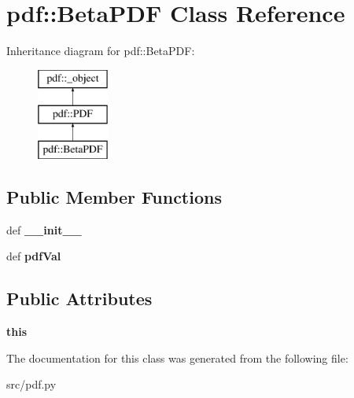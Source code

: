 \hypertarget{classpdf_1_1BetaPDF}{
\section{pdf::BetaPDF Class Reference}
\label{d4/dae/classpdf_1_1BetaPDF}
}
Inheritance diagram for pdf::BetaPDF:\begin{figure}[H]
\begin{center}
\leavevmode
\includegraphics[height=3cm]{d4/dae/classpdf_1_1BetaPDF}
\end{center}
\end{figure}
\subsection*{Public Member Functions}
\begin{DoxyCompactItemize}
\item 
\hypertarget{classpdf_1_1BetaPDF_a20df6a985b59544305063ed17b7358c5}{
def {\bfseries \_\-\_\-init\_\-\_\-}}
\label{d4/dae/classpdf_1_1BetaPDF_a20df6a985b59544305063ed17b7358c5}

\item 
\hypertarget{classpdf_1_1BetaPDF_ad7f9b56263693e180c38d788048299f0}{
def {\bfseries pdfVal}}
\label{d4/dae/classpdf_1_1BetaPDF_ad7f9b56263693e180c38d788048299f0}

\end{DoxyCompactItemize}
\subsection*{Public Attributes}
\begin{DoxyCompactItemize}
\item 
\hypertarget{classpdf_1_1BetaPDF_afec5aec12f1405624850046968b2bbec}{
{\bfseries this}}
\label{d4/dae/classpdf_1_1BetaPDF_afec5aec12f1405624850046968b2bbec}

\end{DoxyCompactItemize}


The documentation for this class was generated from the following file:\begin{DoxyCompactItemize}
\item 
src/pdf.py\end{DoxyCompactItemize}
